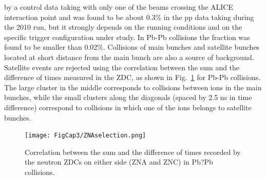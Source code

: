 by a control data taking with only one of the beams crossing the ALICE 
interaction point and was found to be about 0.3\% in the pp data taking 
during the 2010 run, but it strongly depends 
on the running conditions and on the specific trigger configuration under study. 
In Pb-Pb collisions the fraction was found to be smaller than 0.02\%.
Collisions of main bunches and satellite bunches located at short 
distance from the main bunch are also a source of background. 
Satellite events are rejected using the correlation between the sum and the difference 
of times measured in the ZDC, as shown in Fig.~\ref{fig:ZNAselection} for Pb-Pb collisions.
The large cluster in the middle corresponds to collisions between ions 
in the main bunches, while the small clusters along the diagonals (spaced by 
2.5 ns in time difference) correspond to collisions in which one of the ions belongs
to satellite bunches.
\begin{figure}[!h]
\centering
\texttt{[image: FigCap3/ZNAselection.png]}
\caption{Correlation between the sum and the difference of times recorded by the neutron ZDCs on either side (ZNA and ZNC) in Pb?Pb collisions. }
\label{fig:ZNAselection}
\end{figure}


